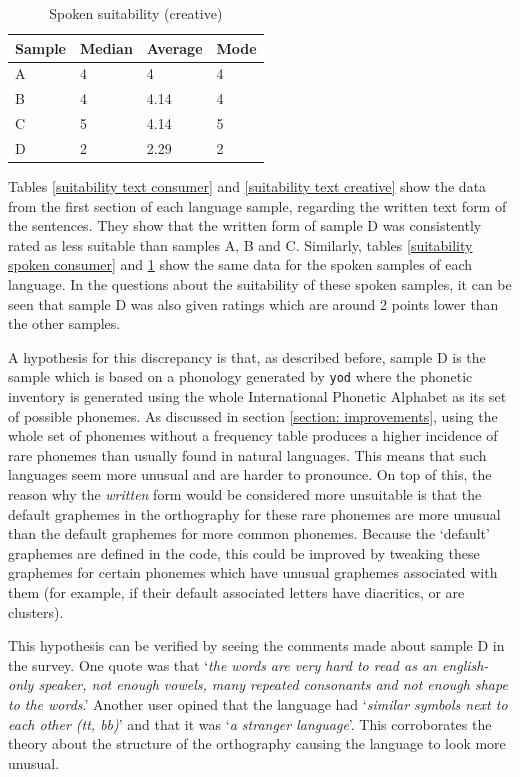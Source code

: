 \documentclass{report}
\begin{document}
	\begin{table}[h]
		\caption{Spoken suitability (creative)}
		\label{suitability spoken creative}
		\centering
		\begin{tabular}{|l|l|l|l|}
			\hline
			\rowcolor[HTML]{D8D8D8}Sample & Median & Average & Mode \\ \hline
			A      & 4      & 4    & 4    \\
			B      & 4      & 4.14    & 4    \\
			C      & 5      & 4.14    & 5    \\
			D      & 2      & 2.29    & 2    \\ \hline
		\end{tabular}
	\end{table}

	Tables \ref{suitability text consumer} and \ref{suitability text creative} show the data from the first section of each language sample, regarding the written text form of the sentences. They show that the written form of sample D was consistently rated as less suitable than samples A, B and C. Similarly, tables \ref{suitability spoken consumer} and \ref{suitability spoken creative} show the same data for the spoken samples of each language. In the questions about the suitability of these spoken samples, it can be seen that sample D was also given ratings which are around 2 points lower than the other samples.
	
	A hypothesis for this discrepancy is that, as described before, sample D is the sample which is based on a phonology generated by \texttt{yod} where the phonetic inventory is generated using the whole International Phonetic Alphabet as its set of possible phonemes. As discussed in section \ref{section: improvements}, using the whole set of phonemes without a frequency table produces a higher incidence of rare phonemes than usually found in natural languages. This means that such languages seem more unusual and are harder to pronounce. On top of this, the reason why the \textit{written} form would be considered more unsuitable is that the default graphemes in the orthography for these rare phonemes are more unusual than the default graphemes for more common phonemes. Because the `default' graphemes are defined in the code, this could be improved by tweaking these graphemes for certain phonemes which have unusual graphemes associated with them (for example, if their default associated letters have diacritics, or are clusters).
	
	This hypothesis can be verified by seeing the comments made about sample D in the survey. One quote was that `\textit{the words are very hard to read as an english-only speaker, not enough vowels, many repeated consonants and not enough shape to the words}.' Another user opined that the language had `\textit{similar symbols next to each other (tt, bb)}' and that it was `\textit{a stranger language}'. This corroborates the theory about the structure of the orthography causing the language to look more unusual.
	
\end{document}
